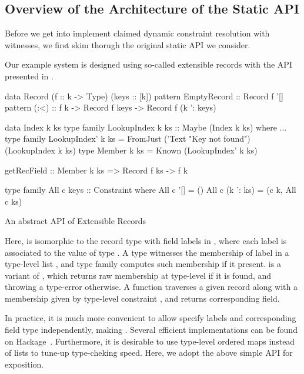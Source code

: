 \documentclass[demotion-paper.tex]{subfiles}
\begin{document}
\subsection{Overview of the Architecture of the Static API}\label{sec:static-api}
Before we get into implement claimed dynamic constraint resolution with witnesses, we first skim thorugh the original static API we consider.

Our example system is designed using so-called extensible records with the API presented in .
\begin{listing}[htbp]
\begin{code}
data Record (f :: k -> Type) (keys :: [k])
pattern EmptyRecord :: Record f '[]
pattern (:<) :: f k -> Record f keys -> Record f (k ': keys)

data Index k ks
type family LookupIndex k ks :: Maybe (Index k ks) where ...
type family LookupIndex' k ks = 
  FromJust ('Text "Key not found") (LookupIndex k ks)
type Member k ks = Known (LookupIndex' k ks)

getRecField :: Member k ks => Record f ks -> f k

type family All c keys :: Constraint where
  All c '[] = ()
  All c (k ': ks) = (c k, All c ks)
\end{code}
\caption{An abstract API of Extensible Records}
\label{lst:ext-rec-api}
\end{listing}
Here,  is isomorphic to the record type with field labels in , where each label  is associated to the value of type .
A type  witnesses the membership of label  in a type-level list , and  type family computes such membership if it present.
 is a variant of , which returns raw membership at type-level if it is found, and throwing a type-error otherwise.
A function  traverses a given record along with a membership  given by type-level constraint , and returns corresponding field.

In practice, it is much more convenient to allow specify labels and corresponding field type independently, making .
Several efficient implementations can be found on Hackage~\cite{Kinoshita:2020aa,Sterling:2020aa,Thiemann:2020aa}.
Furthermore, it is desirable to use type-level ordered maps instead of lists to tune-up type-cheking speed.
Here, we adopt the above simple API for exposition.
\end{document}
